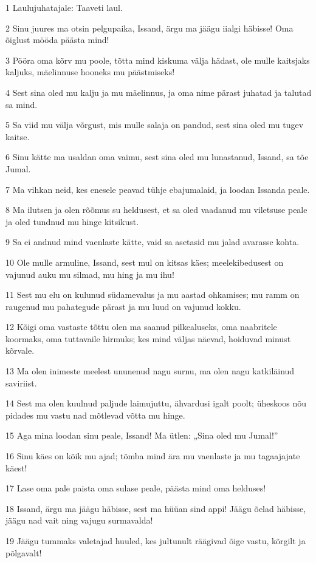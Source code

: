 \par 1 Laulujuhatajale: Taaveti laul.
\par 2 Sinu juures ma otsin pelgupaika, Issand, ärgu ma jäägu iialgi häbisse! Oma õiglust mööda päästa mind!
\par 3 Pööra oma kõrv mu poole, tõtta mind kiskuma välja hädast, ole mulle kaitsjaks kaljuks, mäelinnuse hooneks mu päästmiseks!
\par 4 Sest sina oled mu kalju ja mu mäelinnus, ja oma nime pärast juhatad ja talutad sa mind.
\par 5 Sa viid mu välja võrgust, mis mulle salaja on pandud, sest sina oled mu tugev kaitse.
\par 6 Sinu kätte ma usaldan oma vaimu, sest sina oled mu lunastanud, Issand, sa tõe Jumal.
\par 7 Ma vihkan neid, kes enesele peavad tühje ebajumalaid, ja loodan Issanda peale.
\par 8 Ma ilutsen ja olen rõõmus su heldusest, et sa oled vaadanud mu viletsuse peale ja oled tundnud mu hinge kitsikust.
\par 9 Sa ei andnud mind vaenlaste kätte, vaid sa asetasid mu jalad avarasse kohta.
\par 10 Ole mulle armuline, Issand, sest mul on kitsas käes; meelekibedusest on vajunud auku mu silmad, mu hing ja mu ihu!
\par 11 Sest mu elu on kulunud südamevalus ja mu aastad ohkamises; mu ramm on raugenud mu pahategude pärast ja mu luud on vajunud kokku.
\par 12 Kõigi oma vastaste tõttu olen ma saanud pilkealuseks, oma naabritele koormaks, oma tuttavaile hirmuks; kes mind väljas näevad, hoiduvad minust kõrvale.
\par 13 Ma olen inimeste meelest ununenud nagu surnu, ma olen nagu katkiläinud saviriist.
\par 14 Sest ma olen kuulnud paljude laimujuttu, ähvardusi igalt poolt; üheskoos nõu pidades mu vastu nad mõtlevad võtta mu hinge.
\par 15 Aga mina loodan sinu peale, Issand! Ma ütlen: „Sina oled mu Jumal!”
\par 16 Sinu käes on kõik mu ajad; tõmba mind ära mu vaenlaste ja mu tagaajajate käest!
\par 17 Lase oma pale paista oma sulase peale, päästa mind oma helduses!
\par 18 Issand, ärgu ma jäägu häbisse, sest ma hüüan sind appi! Jäägu õelad häbisse, jäägu nad vait ning vajugu surmavalda!
\par 19 Jäägu tummaks valetajad huuled, kes jultunult räägivad õige vastu, kõrgilt ja põlgavalt!
